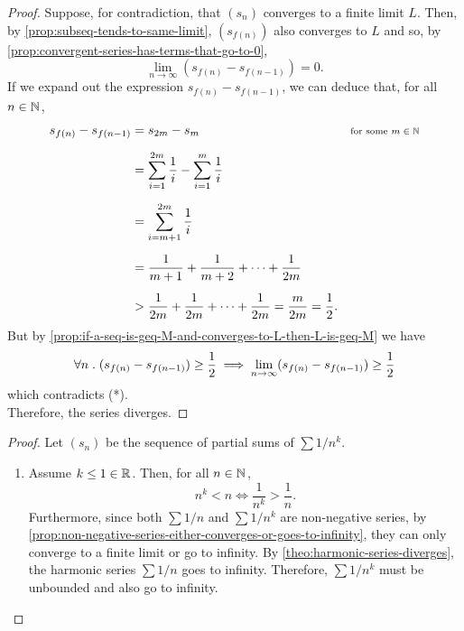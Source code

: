 \documentclass[../MathsNotesBase.tex]{subfiles}
\begin{document}
{\begin{proof}
			Suppose, for contradiction, that $(s_n)$ converges to a finite limit $L$. Then, by \autoref{prop:subseq-tends-to-same-limit}, $(s_{f(n)})$ also converges to $L$ and so, by \autoref{prop:convergent-series-has-terms-that-go-to-0},
			\[ \lim_{n \to \infty} (s_{f(n)} - s_{f(n-1)}) = 0. \tag{*} \]
			\nl
			If we expand out the expression ${ s_{f(n)} - s_{f(n-1)} }$, we can deduce that, for all ${ n \in \mathbb{N}^{} }$,
			\[\begin{aligned}
				s_{f(n)} - s_{f(n-1)} &= s_{2m} - s_m  &\sidecomment{for some ${ m \in \N{} }$} \nn
				&= \sum_{i=1}^{2m} \frac{1}{i} - \sum_{i=1}^m \frac{1}{i} &\sidecomment{} \nn
				&= \sum_{i=m+1}^{2m} \frac{1}{i} &\sidecomment{} \nn
				&= \frac{1}{m+1} + \frac{1}{m+2} + \cdots + \frac{1}{2m} &\sidecomment{} \nn
				&> \frac{1}{2m} + \frac{1}{2m} + \cdots + \frac{1}{2m} = \frac{m}{2m} = \frac{1}{2}.
			\end{aligned}\]
			\nl
			But by \autoref{prop:if-a-seq-is-geq-M-and-converges-to-L-then-L-is-geq-M} we have
			\[ \forall n \;.\; (s_{f(n)} - s_{f(n-1)}) \geq \frac{1}{2} \implies \lim_{n \to \infty} (s_{f(n)} - s_{f(n-1)}) \geq \frac{1}{2} \]
			which contradicts (*).\\
			
			Therefore, the series diverges.
		\end{proof}
	
		\bigskip
		\begin{proof}\nl
			Let $(s_n)$ be the sequence of partial sums of ${ \sum 1/n^k }$.
			\begin{enumerate}[label=(\roman*)]
				\item Assume ${ k \leq 1 \in \mathbb{R}^{} }$. Then, for all ${ n \in \mathbb{N}^{} }$,
				\[ n^k < n \iff \frac{1}{n^k} > \frac{1}{n}. \]
				Furthermore, since both ${ \sum 1/n }$ and ${ \sum 1/n^k }$ are non-negative series, by \autoref{prop:non-negative-series-either-converges-or-goes-to-infinity}, they can only converge to a finite limit or go to infinity. By \autoref{theo:harmonic-series-diverges}, the harmonic series ${ \sum 1/n }$ goes to infinity. Therefore, ${ \sum 1/n^k }$ must be unbounded and also go to infinity.
				

\end{enumerate}
\end{proof}}
\end{document}
